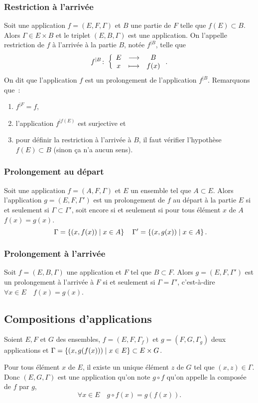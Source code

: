 \subsubsection{Restriction à l'arrivée}
\label{chap3-subsubsec:restrictionarr}
Soit une application \(f=(E,F,\Gamma)\) et \(B\) une partie de \(F\) telle que \(f(E) \subset B\). Alors \(\Gamma \in E \times B\) et le triplet \((E,B,\Gamma)\) est une application. On l'appelle restriction de \(f\) à l'arrivée à la partie \(B\), notée \(f^{|B}\), telle que
\begin{equation}
f^{|B}\colon \left\{\begin{array}{ccc} E & \longrightarrow &B\\ x & \longmapsto & f(x) \end{array} \right..
\end{equation}
On dit que l'application \(f\) est un prolongement de l'application \(f^{|B}\). Remarquons que~:
\begin{enumerate}
    \item \(f^{|F}=f\), 
    \item l'application \(f^{|f(E)}\) est surjective et 
    \item pour définir la restriction à l'arrivée à \(B\), il faut vérifier l'hypothèse \(f(E) \subset B\) (sinon ça n'a aucun sens).
\end{enumerate}

\subsubsection{Prolongement au départ}
\label{chap3-subsubsec:prolongementdep}
Soit une application \(f=(A,F,\Gamma)\) et \(E\) un ensemble tel que \(A \subset E\). Alors l'application \(g=(E,F,\Gamma')\) est un prolongement de \(f\) au départ à la partie \(E\) si et seulement si \(\Gamma \subset \Gamma'\), soit encore si et seulement si pour tous élément \(x\) de \(A\) \(f(x)=g(x)\).
\begin{equation}\
\Gamma=\left\{(x,f(x))\mathrel{}\middle|\mathrel{}x \in A\right\} \quad \Gamma'=\left\{(x,g(x))\mathrel{}\middle|\mathrel{}x \in A\right\}.
\end{equation}
\subsubsection{Prolongement à l'arrivée}
\label{chap3-subsubsec:prolongementarr}
Soit \(f=(E,B,\Gamma)\) une application et \(F\) tel que \(B \subset F\). Alors \(g=(E,F,\Gamma')\) est un prolongement à l'arrivée à \(F\) si et seulement si \(\Gamma = \Gamma'\), c'est-à-dire \(\forall x \in E \quad f(x)=g(x)\).
%
\subsection{Compositions d'applications}
\label{chap3-subsec:compapp}
\begin{defdef}
  Soient \(E,F\) et \(G\) des ensembles, \(f=(E,F,\Gamma_f)\) et \(g=(F,G, \Gamma_g)\) deux applications et \(\Gamma = \left\{(x,g(f(x)))\mathrel{}\middle|\mathrel{}x \in E\right\} \subset E \times G\).
\end{defdef}
Pour tous élément \(x\) de \(E\), il existe un unique élément \(z\) de \(G\) tel que \((x,z) \in \Gamma\). Donc \((E,G,\Gamma)\) est une application qu'on note \(g \circ f\) qu'on appelle la composée de \(f\) par \(g\),
\begin{equation}
  \forall x \in E \quad g \circ f(x)=g(f(x)).
\end{equation}

